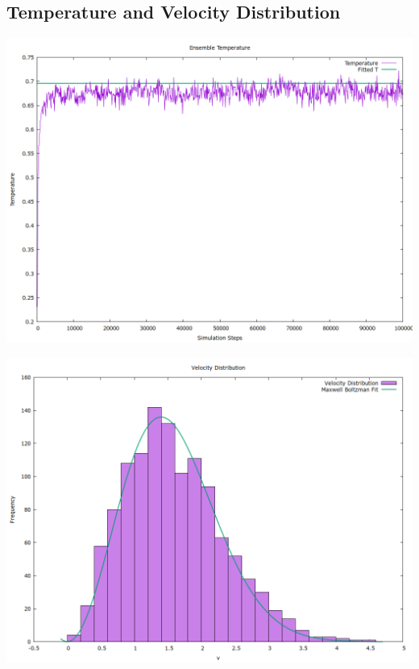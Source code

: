 \documentclass[a4paper,11pt,twoside]{article}
\begin{document}
\subsection{Temperature and Velocity Distribution}
\label{sec:org70936e0}
\begin{center}
\includegraphics[width=.9\linewidth]{../../runs/nve_lammps_pair_style/plots/temperature.png}
\end{center}

\begin{center}
\includegraphics[width=.9\linewidth]{../../runs/nve_lammps_pair_style/plots/velocity_dist.png}
\end{center}
\end{document}
